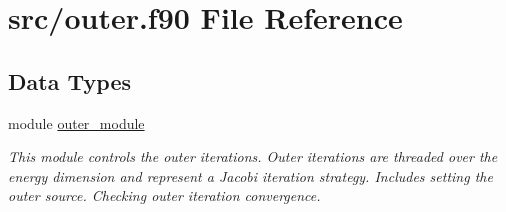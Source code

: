 \hypertarget{outer_8f90}{\section{src/outer.f90 File Reference}
\label{outer_8f90}
}
\subsection*{Data Types}
\begin{DoxyCompactItemize}
\item 
module \hyperlink{classouter__module}{outer\-\_\-module}
\begin{DoxyCompactList}\small\item\em This module controls the outer iterations. Outer iterations are threaded over the energy dimension and represent a Jacobi iteration strategy. Includes setting the outer source. Checking outer iteration convergence. \end{DoxyCompactList}\end{DoxyCompactItemize}
